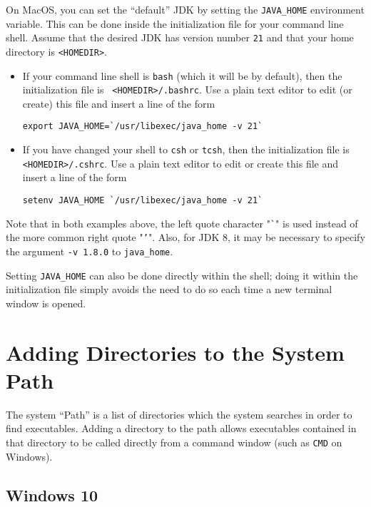 \documentclass{article}
\begin{document}
On MacOS, you can set the ``default'' JDK by setting the {\tt JAVA\_HOME}
environment variable.  This can be done inside the initialization file for your
command line shell.  Assume that the desired JDK has version number {\tt 21}
and that your home directory is {\tt <HOMEDIR>}.

\begin{itemize}

\item If your command line shell is {\tt bash} (which
it will be by default), then the initialization file is {\tt
<HOMEDIR>/.bashrc}. Use a plain text editor to edit (or create) this file and
insert a line of the form
%
\begin{lstlisting}[]
  export JAVA_HOME=`/usr/libexec/java_home -v 21`
\end{lstlisting}
%

\item If you have changed your shell to {\tt csh} or {\tt tcsh},
then the initialization file is {\tt <HOMEDIR>/.cshrc}. Use a plain text editor
to edit or create this file and insert a line of the form
%
\begin{lstlisting}[]
  setenv JAVA_HOME `/usr/libexec/java_home -v 21`
\end{lstlisting}
%

\end{itemize}

Note that in both examples above, the left quote character "{\tt \`{}}" is used
instead of the more common right quote "{\tt '}".  Also, for JDK 8, it may be
necessary to specify the argument {\tt -v 1.8.0} to {\tt java\_home}.

Setting {\tt JAVA\_HOME} can also be done directly within the shell;
doing it within the initialization file simply avoids the need to do
so each time a new terminal window is opened.

\section{Adding Directories to the System Path}
\label{SettingPath}

The system ``Path'' is a list of directories which the system searches
in order to find executables. Adding a directory to the path allows
executables contained in that directory to be called directly from a
command window (such as {\tt CMD} on Windows).

\subsection{Windows 10}
\end{document}

